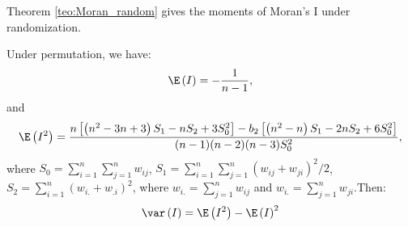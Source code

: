 








Theorem \ref{teo:Moran_random} gives the moments of Moran's I under randomization. 

\begin{theorem}\label{teo:Moran_random}
Under permutation, we have:
\begin{equation*}
\E\left(I\right) = - \frac{1}{n - 1}, 
\end{equation*}
%
and
\begin{equation*}
\E\left(I^2\right) = \frac{n\left[\left(n^2 - 3n + 3\right)S_1 - nS_2 + 3S_0^2\right]-b_2\left[\left(n^2 - n\right)S_1 - 2nS_2 + 6S_0^2\right]}{(n-1)(n-2)(n-3)S_0^2},
\end{equation*}
%
where $S_0=\sum_{i = 1}^n\sum_{j=1}^nw_{ij}$, $S_1= \sum_{i = 1}^n\sum_{j = 1}^n(w_{ij} + w_{ji})^2/2$, $S_2 = \sum_{i = 1}^n(w_{i.} + w_{.i})^2$, where $w_{i.}= \sum_{j = 1}^nw_{ij}$ and $w_{i.}=\sum_{j = 1}^nw_{ji}$.Then:
\begin{equation*}
\var\left(I\right)=\E\left(I^2\right) - \E\left(I\right)^2
\end{equation*}
\end{theorem}

